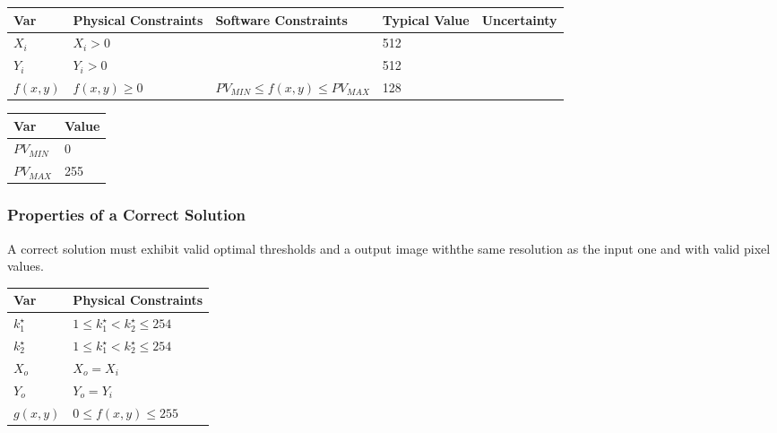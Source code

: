 \documentclass[12pt]{article}
\begin{document}
\begin{table}[!h]
  \caption{Input Variables} \label{TblInputVar}
  \renewcommand{\arraystretch}{1.2}
\noindent \begin{longtable*}{l l l l c} 
  \toprule
\textbf{Var} & \textbf{Physical Constraints} & \textbf{Software Constraints} &
\textbf{Typical Value} & \textbf{Uncertainty}\\
  \midrule 
  $X_i$ & $X_i > 0$ & & 512 & 
  \\
  $Y_i$ & $Y_i > 0$ & & 512 & 
  \\
  $f(x,y)$ & $f(x,y) \ge 0$ & $PV_{MIN} \le f(x,y) \le PV_{MAX}$ & 128 & 
  \\
  \bottomrule
\end{longtable*}
\end{table}

\begin{table}[!h]
\caption{Specification Parameter Values} \label{TblSpecParams}
\renewcommand{\arraystretch}{1.2}
\noindent \begin{longtable*}{l l} 
  \toprule
  \textbf{Var} & \textbf{Value} \\
  \midrule 
  $PV_{MIN}$ & 0\\
  $PV_{MAX}$ & 255\\
  \bottomrule
\end{longtable*}
\end{table}

\subsubsection{Properties of a Correct Solution} \label{sec_CorrectSolution}

\noindent
A correct solution must exhibit valid optimal thresholds and a output image
withthe same resolution as the input one and with valid pixel values.

\begin{table}[!h]
\caption{Output Variables} \label{TblOutputVar}
\renewcommand{\arraystretch}{1.2}
\noindent \begin{longtable*}{l l} 
  \toprule
  \textbf{Var} & \textbf{Physical Constraints} \\
  \midrule 
  $k^{\star}_{1}$ & $1 \le k^{\star}_{1} < k^{\star}_{2} \le 254$\\
  $k^{\star}_{2}$ & $1 \le k^{\star}_{1} < k^{\star}_{2} \le 254$\\
  $X_o$ & $X_o = X_i$\\
  $Y_o$ & $Y_o = Y_i$\\
  $g(x,y)$ & $0 \le f(x,y) \le 255$ 
  \\
  \bottomrule
\end{longtable*}
\end{table}
\end{document}
